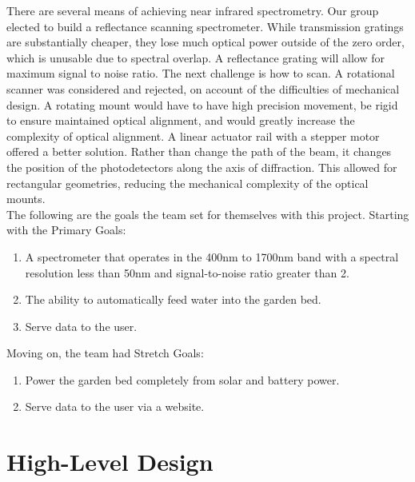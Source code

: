 \documentclass[journal]{IEEEtran}
\begin{document}
There are several means of achieving near infrared spectrometry. Our group elected to build a reflectance 
scanning spectrometer. While transmission gratings are substantially cheaper, they lose much optical power 
outside of the zero order, which is unusable due to spectral overlap. A reflectance grating will allow for 
maximum signal to noise ratio. The next challenge is how to scan. A rotational scanner was considered and 
rejected, on account of the difficulties of mechanical design. A rotating mount would have to have high 
precision movement, be rigid to ensure maintained optical alignment, and would greatly increase the 
complexity of optical alignment. A linear actuator rail with a stepper motor offered a better solution. 
Rather than change the path of the beam, it changes the position of the photodetectors along the axis of 
diffraction. This allowed for rectangular geometries, reducing the mechanical complexity of the optical 
mounts.\\

The following are the goals the team set for themselves with this project. Starting with the Primary Goals:
\begin{enumerate}
	\item A spectrometer that operates in the 400nm to 1700nm band with a spectral resolution less
	      than 50nm and signal-to-noise ratio greater than 2.
	\item The ability to automatically feed water into the garden bed.
	\item Serve data to the user.
\end{enumerate}
Moving on, the team had Stretch Goals:
\begin{enumerate}
	\item Power the garden bed completely from solar and battery power.
	\item Serve data to the user via a website.
\end{enumerate}

\section{High-Level Design}
\end{document}
